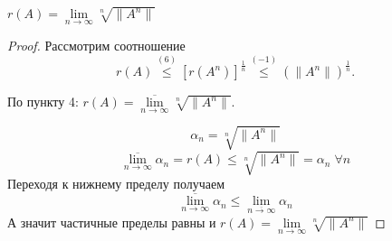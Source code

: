 \begin{statement}[$7$]
    $r(A)=\lim\limits_{n \to \infty} \sqrt[n]{\|A^n\|}$
\end{statement}

\begin{proof}
    Рассмотрим соотношение $$r(A) \stackrel{(6)}{\leq} \left[r(A^n)\right]^{\frac1n} \stackrel{(-1)}{\leq} (\|A^n\|)^{\frac{1}{n}}.$$

    По пункту 4: $r(A)=\overline{\lim\limits_{n \to \infty}} \sqrt[n]{\|A^n\|}$.

    $$\alpha_n=\sqrt[n]{\|A^n\|}$$
    $$\overline{\lim\limits_{n \to \infty}} \alpha_n = r(A) \leq \sqrt[n]{\|A^n\|} = \alpha_n \; \forall n$$
    Переходя к нижнему пределу получаем
    $$\overline{\lim\limits_{n \to \infty}} \alpha_n \leqslant 
    \lim\limits_{\overline{n \to \infty}}\alpha_n$$
    А значит частичные пределы равны и $r(A)=\lim\limits_{n \to \infty} \sqrt[n]{\|A^n\|}$
\end{proof}
